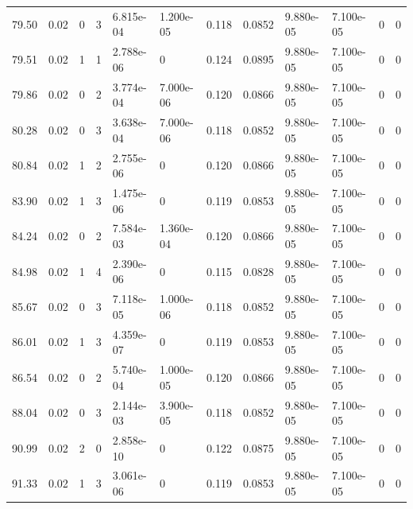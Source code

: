 \documentclass[preview]{standalone}
\begin{document}
{{{\begin{tabular}{L{1.2cm}C{1.2cm} C{0.3cm}C{0.5cm} C{1.4cm}C{1.4cm} C{1.4cm}C{1.4cm} C{1.6cm}C{1.6cm} C{1.6cm}C{1.6cm}}
  79.50  &  0.02  & 0     &  3 &  6.815e-04  & 1.200e-05  &  0.118&   0.0852& 9.880e-05 & 7.100e-05   &  0 & 0  \\ 
  79.51  &  0.02  & 1     &  1 &  2.788e-06  & 0  &  0.124&   0.0895& 9.880e-05 & 7.100e-05   &  0 & 0  \\ 
  79.86  &  0.02  & 0     &  2 &  3.774e-04  & 7.000e-06  &  0.120&   0.0866& 9.880e-05 & 7.100e-05   &  0 & 0  \\ 
  80.28  &  0.02  & 0     &  3 &  3.638e-04  & 7.000e-06  &  0.118&   0.0852& 9.880e-05 & 7.100e-05   &  0 & 0  \\ 
  80.84  &  0.02  & 1     &  2 &  2.755e-06  & 0  &  0.120&   0.0866& 9.880e-05 & 7.100e-05   &  0 & 0  \\ 
  83.90  &  0.02  & 1     &  3 &  1.475e-06  & 0  &  0.119&   0.0853& 9.880e-05 & 7.100e-05   &  0 & 0  \\ 
  84.24  &  0.02  & 0     &  2 &  7.584e-03  & 1.360e-04  &  0.120&   0.0866& 9.880e-05 & 7.100e-05   &  0 & 0  \\ 
  84.98  &  0.02  & 1     &  4 &  2.390e-06  & 0  &  0.115&   0.0828& 9.880e-05 & 7.100e-05   &  0 & 0  \\ 
  85.67  &  0.02  & 0     &  3 &  7.118e-05  & 1.000e-06  &  0.118&   0.0852& 9.880e-05 & 7.100e-05   &  0 & 0  \\ 
  86.01  &  0.02  & 1     &  3 &  4.359e-07  & 0  &  0.119&   0.0853& 9.880e-05 & 7.100e-05   &  0 & 0  \\ 
  86.54  &  0.02  & 0     &  2 &  5.740e-04  & 1.000e-05  &  0.120&   0.0866& 9.880e-05 & 7.100e-05   &  0 & 0  \\ 
  88.04  &  0.02  & 0     &  3 &  2.144e-03  & 3.900e-05  &  0.118&   0.0852& 9.880e-05 & 7.100e-05   &  0 & 0  \\ 
  90.99  &  0.02  & 2     &  0 &  2.858e-10  & 0  &  0.122&   0.0875& 9.880e-05 & 7.100e-05   &  0 & 0  \\ 
  91.33  &  0.02  & 1     &  3 &  3.061e-06  & 0  &  0.119&   0.0853& 9.880e-05 & 7.100e-05   &  0 & 0  \\ 
\hline 
\end{tabular} 

}}}
\end{document}
